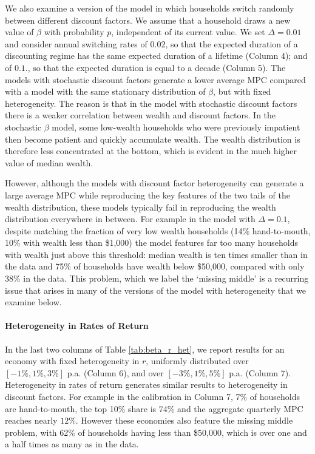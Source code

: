 We also examine a version of the model in which households switch randomly between different discount factors. We assume that a household draws a new value of $\beta$ with probability $p$, independent of its current value. We set $\Delta=0.01$ and consider annual switching rates of $0.02$, so that the expected duration of a discounting regime has the same expected duration of a lifetime (Column 4); and of $0.1.$, so that the expected duration is equal to a decade  (Column 5). The models with stochastic discount factors generate a lower average MPC compared with a model with the same stationary distribution of $\beta$, but with fixed heterogeneity. The reason is that in the model with stochastic discount factors there is a weaker correlation between wealth and discount factors. In the stochastic $\beta$ model, some low-wealth households who were previously impatient then become patient and quickly accumulate wealth. The wealth distribution is therefore less concentrated at the bottom, which is evident in the much higher value of median wealth. 

However, although the models with discount factor heterogeneity can generate a large average MPC while reproducing the key features of the two tails of the wealth distribution, these models typically fail in reproducing the wealth distribution everywhere in between. For example in the model with $\Delta=0.1$, despite matching the fraction of very low wealth households (14\% hand-to-mouth, 10\% with wealth less than \$1,000) the model features far too many households with wealth just above this threshold: median wealth is ten times smaller than in the data and 75\% of households have wealth below \$50,000, compared with only 38\% in the data. This problem, which we label the `missing middle' is a recurring issue that arises in many of the versions of the model with heterogeneity that we examine below.


\paragraph{Heterogeneity in Rates of Return}
\label{sec:one_asset_return}

In the last two columns of Table \ref{tab:beta_r_het}, we report results for an economy with fixed heterogeneity in $r$, uniformly distributed over $[-1\%,1\%,3\%]$ p.a. (Column 6), and over $[ -3\%,1\%,5\%] $  p.a. (Column 7). Heterogeneity in rates of return generates similar results to heterogeneity in discount factors. For example in the calibration in Column 7, 7\% of households are hand-to-mouth, the top 10\% share is 74\% and the aggregate quarterly MPC reaches nearly $12\%$. However these economies also feature the missing middle problem, with 62\% of households having less than \$50,000, which is over one and a half times as many as in the data.

